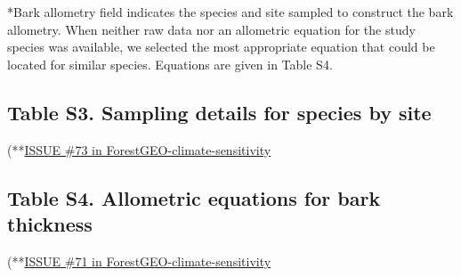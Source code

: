 \documentclass[
]{article}
\begin{document}
\begin{table}[!h]
\centering
{}
\end{table}

*Bark allometry field indicates the species and site sampled to
construct the bark allometry. When neither raw data nor an allometric
equation for the study species was available, we selected the most
appropriate equation that could be located for similar species.
Equations are given in Table S4.

\newpage

\hypertarget{table-s3.-sampling-details-for-species-by-site}{%
\subsection{Table S3. Sampling details for species by
site}\label{table-s3.-sampling-details-for-species-by-site}}

(**\href{https://github.com/EcoClimLab/ForestGEO-climate-sensitivity/issues/73}{ISSUE
\#73 in ForestGEO-climate-sensitivity}

\newpage

\hypertarget{table-s4.-allometric-equations-for-bark-thickness}{%
\subsection{Table S4. Allometric equations for bark
thickness}\label{table-s4.-allometric-equations-for-bark-thickness}}

(**\href{https://github.com/EcoClimLab/ForestGEO-climate-sensitivity/issues/71}{ISSUE
\#71 in ForestGEO-climate-sensitivity}
\end{document}
